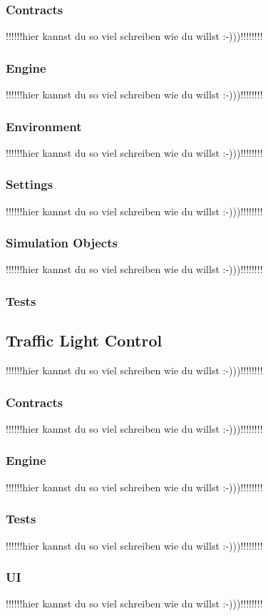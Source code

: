 \documentclass[12pt,a4paper,bibliography=totocnumbered,listof=totocnumbered]{scrartcl}
\begin{document}
\subsubsection{Contracts}
!!!!!!hier kannst du so viel schreiben wie du willst :-)))!!!!!!!!
\subsubsection{Engine}
!!!!!!hier kannst du so viel schreiben wie du willst :-)))!!!!!!!!
\subsubsection{Environment}
!!!!!!hier kannst du so viel schreiben wie du willst :-)))!!!!!!!!
\subsubsection{Settings}
!!!!!!hier kannst du so viel schreiben wie du willst :-)))!!!!!!!!
\subsubsection{Simulation Objects}
!!!!!!hier kannst du so viel schreiben wie du willst :-)))!!!!!!!!
\subsubsection{Tests}

\subsection{Traffic Light Control}
!!!!!!hier kannst du so viel schreiben wie du willst :-)))!!!!!!!!
\subsubsection{Contracts}
!!!!!!hier kannst du so viel schreiben wie du willst :-)))!!!!!!!!
\subsubsection{Engine}
!!!!!!hier kannst du so viel schreiben wie du willst :-)))!!!!!!!!
\subsubsection{Tests}
!!!!!!hier kannst du so viel schreiben wie du willst :-)))!!!!!!!!
\subsubsection{UI}
!!!!!!hier kannst du so viel schreiben wie du willst :-)))!!!!!!!!
\end{document}
